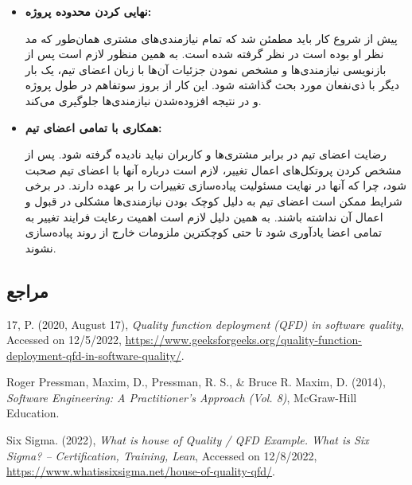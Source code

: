 {\begin{enumerate}[a)]
\begin{itemize}
	\item \textbf{نهایی کردن محدوده پروژه:}

پیش از شروع کار باید مطمئن شد که تمام نیازمندی‌های مشتری همان‌طور که مد نظر او بوده است در نظر گرفته شده است. به همین منظور لازم است پس از بازنویسی نیازمندی‌ها و مشخص نمودن جزئیات آن‌ها با زبان اعضای تیم، یک بار دیگر با ذی‌نفعان مورد بحث گذاشته شود. این کار از بروز سوتفاهم در طول پروژه و در نتیجه افزوده‌شدن نیازمندی‌ها جلوگیری می‌کند.
	
	\item \textbf{همکاری با تمامی اعضای تیم:}

رضایت اعضای تیم در برابر مشتری‌ها و کاربران نباید نادیده گرفته شود. پس از مشخص کردن پروتکل‌های اعمال تغییر، لازم است درباره آنها با اعضای تیم صحبت شود، چرا که آنها در نهایت مسئولیت پیاده‌سازی تغییرات را بر عهده دارند. در برخی شرایط ممکن است اعضای تیم به دلیل کوچک بودن نیازمندی‌ها مشکلی در قبول و اعمال آن نداشته باشند. به همین دلیل لازم است اهمیت رعایت فرایند تغییر به تمامی اعضا یادآوری شود تا حتی کوچکترین ملزومات خارج از روند پیاده‌سازی نشوند.  
\end{itemize}

\end{enumerate}

\subsection*{مراجع}

\begin{latin}
	\begingroup
	\renewcommand{\section}[2]{}%
	
\begin{thebibliography}{9}
	

	17, P. (2020, August 17),
	\textit{Quality function deployment (QFD) in software quality},
	Accessed on 12/5/2022, 
	\url{https://www.geeksforgeeks.org/quality-function-deployment-qfd-in-software-quality/}.

	Roger Pressman, Maxim, D., Pressman, R. S., \& Bruce R. Maxim, D. (2014),
	\textit{Software Engineering: A Practitioner’s Approach (Vol. 8)},
	McGraw-Hill Education.

	Six Sigma. (2022),
	\textit{What is house of Quality / QFD Example. What is Six Sigma? – Certification, Training, Lean},
	Accessed on 12/8/2022, 
	\url{https://www.whatissixsigma.net/house-of-quality-qfd/}.


\end{thebibliography}
\end{latin}}
